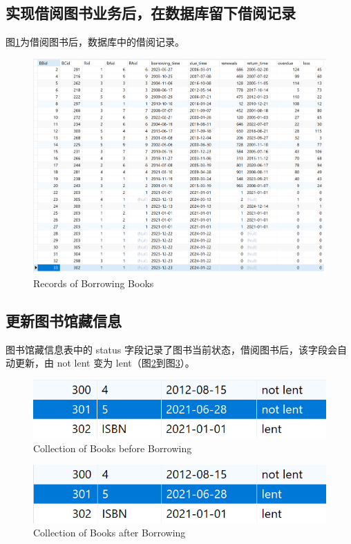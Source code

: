 \documentclass{article}
\begin{document}
\subsection{实现借阅图书业务后，在数据库留下借阅记录}
图\ref{fig:records}为借阅图书后，数据库中的借阅记录。

\begin{figure}[H]
    \centering
    \includegraphics[width=1\textwidth]{../pic/records.png}
    \caption{Records of Borrowing Books}
    \label{fig:records}
\end{figure}

\subsection{更新图书馆藏信息}
图书馆藏信息表中的 status 字段记录了图书当前状态，借阅图书后，该字段会自动更新，由 not lent 变为 lent（图\ref{fig:collection}到图\ref{fig:collection_after}）。

\begin{figure}[H]
    \centering
    \includegraphics[width=1\textwidth]{../pic/collection.png}
    \caption{Collection of Books before Borrowing}
    \label{fig:collection}
\end{figure}

\begin{figure}[H]
    \centering
    \includegraphics[width=1\textwidth]{../pic/collection_after.png}
    \caption{Collection of Books after Borrowing}
    \label{fig:collection_after}
\end{figure}
\end{document}

